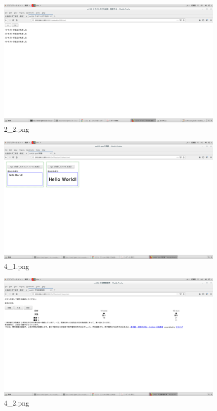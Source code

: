 \documentclass[a4j]{jarticle}
\begin{document}
  \vspace{1cm}
  \begin{figure}[htbp]
    \centering
    \includegraphics[width=13cm]{../webapp/png/2_2.png}
    \caption{2\_2.png}
  \end{figure}

  \vspace{1cm}
  \begin{figure}[htbp]
    \centering
    \includegraphics[width=13cm]{../webapp/png/4_1.png}
    \caption{4\_1.png}
  \end{figure}

  \vspace{1cm}
  \begin{figure}[htbp]
    \centering
    \includegraphics[width=13cm]{../webapp/png/4-2.png}
    \caption{4\_2.png}
  \end{figure}
\end{document}
